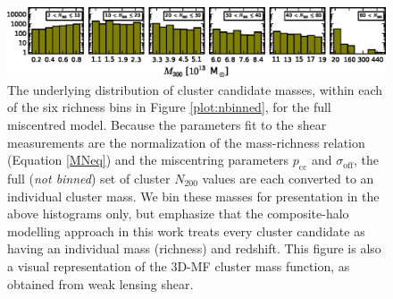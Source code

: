 \begin{figure}
\begin{center}
  \includegraphics[scale=1.0]{plots_ch4/m200panels_NoGaps.eps}
  \caption[Cluster Mass Distributions for each Richness Bin]{The underlying distribution of cluster candidate masses, within each of the six richness bins in Figure \ref{plot:nbinned}, for the full miscentred model. Because the parameters fit to the shear measurements are the normalization of the mass-richness relation (Equation \ref{MNeq}) and the miscentring parameters $p_{\mathrm{cc}}$ and $\sigma_{\mathrm{off}}$, the full ({\it not binned}) set of cluster $N_{200}$ values are each converted to an individual cluster mass. We bin these masses for presentation in the above histograms only, but emphasize that the composite-halo modelling approach in this work treats every cluster candidate as having an individual mass (richness) and redshift. This figure is also a visual representation of the \ac{3D-MF} cluster mass function, as obtained from weak lensing shear.}
\label{plot:multimass}
\end{center}
\end{figure}


